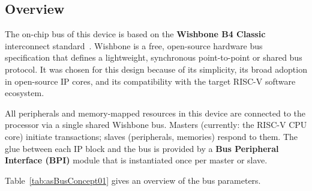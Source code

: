 
\subsection{Overview}

The on-chip bus of this device is based on the \textbf{Wishbone B4 Classic}
interconnect standard~\cite{wishboneB4}.
Wishbone is a free, open-source hardware bus specification that defines
a lightweight, synchronous point-to-point or shared bus protocol.
It was chosen for this design because of its simplicity, its broad adoption
in open-source IP cores, and its compatibility with the target RISC-V
software ecosystem.

All peripherals and memory-mapped resources in this device are connected to
the processor via a single shared Wishbone bus.
Masters (currently: the RISC-V CPU core) initiate transactions; slaves
(peripherals, memories) respond to them.
The glue between each IP block and the bus is provided by a
\textbf{Bus Peripheral Interface (BPI)} module that is instantiated once
per master or slave.

Table~\ref{tab:asBusConcept01} gives an overview of the bus parameters.

